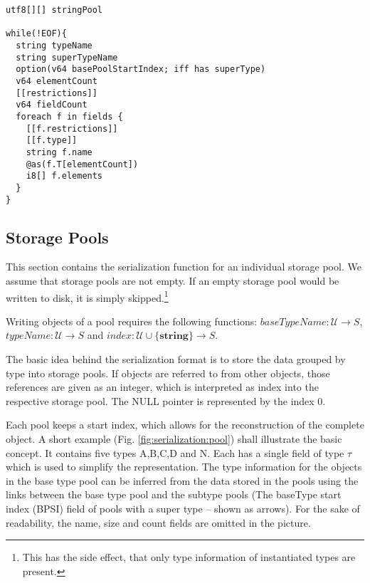 \begin{verbatim}
utf8[][] stringPool

while(!EOF){
  string typeName
  string superTypeName
  option(v64 basePoolStartIndex; iff has superType)
  v64 elementCount
  [[restrictions]]
  v64 fieldCount
  foreach f in fields {
    [[f.restrictions]]
    [[f.type]]
    string f.name
    @as(f.T[elementCount])
    i8[] f.elements
  }
}
\end{verbatim}


\subsection{Storage Pools}

This section contains the serialization function for an individual storage pool. We assume that storage pools are not empty. If an empty storage pool would be written to disk, it is simply skipped.\footnote{This has the side effect, that only type information of instantiated types are present.}

Writing objects of a pool requires the following functions: $baseTypeName: \mathcal{U} → S$, $typeName: \mathcal{U} → S$ and $index: \mathcal{U}\cup\{\textbf{string}\} → S$.

The basic idea behind the serialization format is to store the data grouped by type into storage pools. If objects are referred to from other objects, those references are given as an integer, which is interpreted as index into the respective storage pool. The NULL pointer is represented by the index 0.

Each pool keeps a start index, which allows for the reconstruction of the complete object. A short example (Fig. \ref{fig:serialization:pool}) shall illustrate the basic concept. It contains five types A,B,C,D and N. Each has a single field of type $\tau$ which is used to simplify the representation. The type information for the objects in the base type pool can be inferred from the data stored in the pools using the links between the base type pool and the subtype pools (The \gls{baseType} start index (BPSI) field of pools with a super type -- shown as arrows). For the sake of readability, the name, size and count fields are omitted in the picture.

